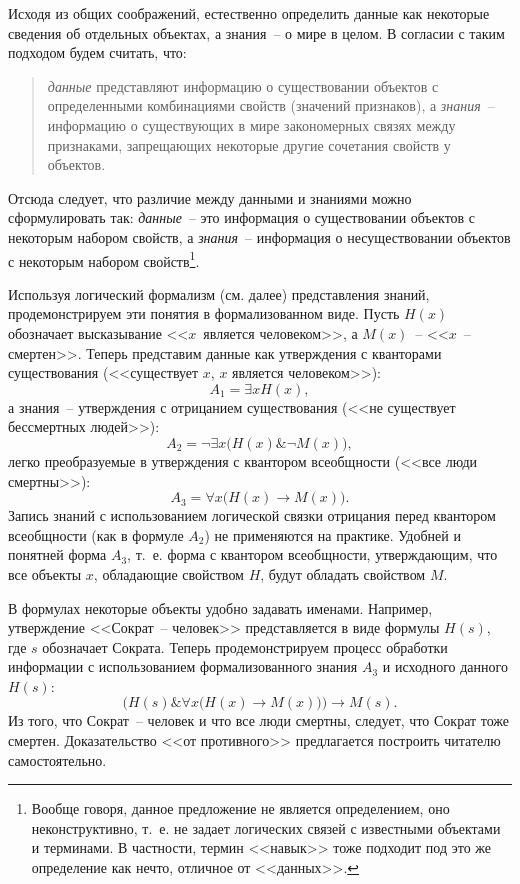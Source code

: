 \documentclass[a4paper,14pt, openany, twoside, final]{extbook} %
\begin{document}
Исходя из общих соображений, естественно определить данные как некоторые сведения об отдельных объектах, а знания~-- о мире в целом. В согласии с таким подходом будем считать, что:
\begin{quote}
{\em данные} представляют информацию о существовании объектов с определенными комбинациями свойств (значений признаков), а {\em знания}~-- информацию о существующих в мире закономерных связях между признаками, запрещающих некоторые другие сочетания свойств у объектов.
\end{quote}

Отсюда следует, что различие между данными и знаниями можно сформулировать так: {\em данные}~-- это информация о существовании объектов с некоторым набором свойств, а {\em знания}~-- информация о несуществовании объектов с некоторым набором свойств\footnote{Вообще говоря, данное предложение не является определением, оно неконструктивно, т.~е. не задает логических связей с известными объектами и терминами. В частности, термин <<навык>> тоже подходит под это же определение как нечто, отличное от <<данных>>.}.

Используя логический формализм (см. далее) представления знаний, продемонстрируем эти понятия в формализованном виде.  Пусть $H(x)$ обозначает высказывание <<$x$~является человеком>>, а $M(x)$~-- <<$x$~-- смертен>>. Теперь представим данные как утверждения с кванторами существования (<<существует $x$, $x$ является человеком>>):
$$
    A_1=\exists x H(x),
$$
а знания~-- утверждения с отрицанием существования (<<не существует бессмертных людей>>):
$$
    A_2=\neg\exists x \big ( H(x) \& \neg M(x) \big ),
$$
легко преобразуемые в утверждения с квантором всеобщности (<<все люди смертны>>):
$$
    A_3=\forall x \big ( H(x)\to M(x)\big ).
$$
Запись знаний с использованием логической связки отрицания перед квантором всеобщности (как в формуле $A_2$) не применяются на практике. Удобней и понятней форма $A_3$, т.~е. форма с квантором всеобщности, утверждающим, что все объекты $x$, обладающие свойством $H$, будут обладать свойством $M$.

В формулах некоторые объекты удобно задавать именами.  Например, утверждение <<Сократ~-- человек>> представляется в виде формулы $H(s)$, где $s$ обозначает Сократа.  Теперь продемонстрируем процесс обработки информации с использованием формализованного знания $A_3$ и исходного данного $H(s)$:
$$
\Big (H(s) \& \forall x \big ( H(x)\to M(x)\big ) \Big ) \to M(s).
$$
Из того, что Сократ~-- человек и что все люди смертны, следует, что Сократ тоже смертен.  Доказательство <<от противного>> предлагается построить читателю самостоятельно.
\end{document}

